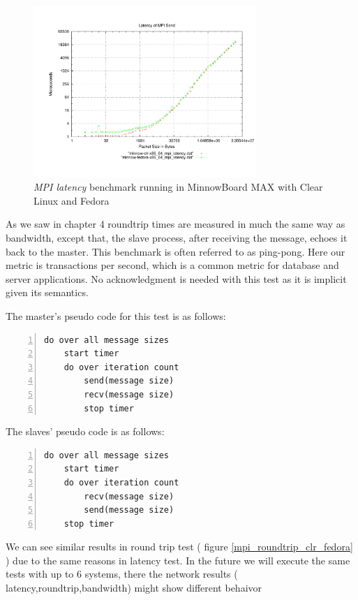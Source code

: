 \begin{figure}[H]
\centering
\includegraphics[width=0.75\textwidth]{images/mpbench_clr_experiments/mpi_latency.pdf}
\caption{\textit{MPI latency} benchmark running in  MinnowBoard MAX with Clear Linux and
Fedora }
\label{mpi_latency_clr_fedora}
\end{figure}



As we saw in chapter 4 roundtrip times are measured in much the same way as
bandwidth, except that, the slave process, after receiving the message, echoes
it back to the master.  This benchmark is often referred to as ping-pong. Here
our metric is transactions per second, which is a common metric for database
and server applications. No acknowledgment is needed with this test as it is
implicit given its semantics.

The master's pseudo code for this test is as follows:

\begin{lstlisting}[frame=single,numbers=left]
  do over all message sizes 
    start timer
    do over iteration count
        send(message size)
        recv(message size) 
        stop timer
\end{lstlisting}

The slaves' pseudo code is as follows:

\begin{lstlisting}[frame=single,numbers=left]
do over all message sizes 
    start timer
    do over iteration count
        recv(message size)
        send(message size)
    stop timer
\end{lstlisting}

We can see similar results in round trip test ( figure
\ref{mpi_roundtrip_clr_fedora} ) due to the same reasons in latency test. In
the future we will execute the same tests with up to 6 systems, there the
network results ( latency,roundtrip,bandwidth) might show different behaivor

